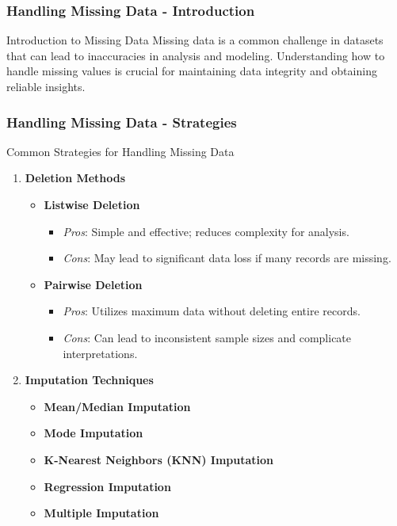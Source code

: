 \documentclass{beamer}
\begin{document}
\begin{frame}[fragile]
    \frametitle{Handling Missing Data - Introduction}
    \begin{block}{Introduction to Missing Data}
        Missing data is a common challenge in datasets that can lead to inaccuracies in analysis and modeling. Understanding how to handle missing values is crucial for maintaining data integrity and obtaining reliable insights.
    \end{block}
\end{frame}

\begin{frame}[fragile]
    \frametitle{Handling Missing Data - Strategies}
    \begin{block}{Common Strategies for Handling Missing Data}
        \begin{enumerate}
            \item \textbf{Deletion Methods}
            \begin{itemize}
                \item \textbf{Listwise Deletion} 
                \begin{itemize}
                    \item \textit{Pros}: Simple and effective; reduces complexity for analysis.
                    \item \textit{Cons}: May lead to significant data loss if many records are missing.
                \end{itemize}
                \item \textbf{Pairwise Deletion}
                \begin{itemize}
                    \item \textit{Pros}: Utilizes maximum data without deleting entire records.
                    \item \textit{Cons}: Can lead to inconsistent sample sizes and complicate interpretations.
                \end{itemize}
            \end{itemize}
            \item \textbf{Imputation Techniques}
            \begin{itemize}
                \item \textbf{Mean/Median Imputation}
                \item \textbf{Mode Imputation}
                \item \textbf{K-Nearest Neighbors (KNN) Imputation}
                \item \textbf{Regression Imputation}
                \item \textbf{Multiple Imputation}
            \end{itemize}
        \end{enumerate}
    \end{block}
\end{frame}
\end{document}
